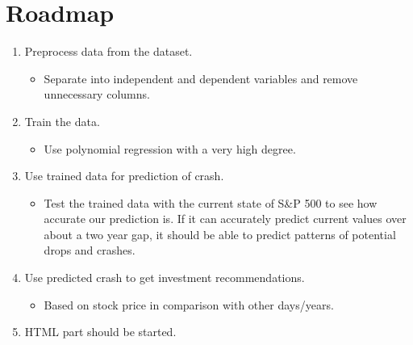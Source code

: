 \documentclass{article}
\begin{document}
\section{Roadmap}
	\begin{enumerate}
		\item Preprocess data from the dataset.
			\begin{itemize}
				\item Separate into independent and dependent variables and remove unnecessary columns.
			\end{itemize}			 
		\item Train the data.
			\begin{itemize}
				\item Use polynomial regression with a very high degree.
			\end{itemize}	
		\item Use trained data for prediction of crash.
			\begin{itemize}
				\item Test the trained data with the current state of S\&P 500 to see how accurate our prediction is. If it can accurately predict current values over about a two year gap, it should be able to predict patterns of potential drops and crashes.
			\end{itemize}	
		\item Use predicted crash to get investment recommendations.
			\begin{itemize}
				\item Based on stock price in comparison with other days/years.
			\end{itemize}	
		\item HTML part should be started.

	\end{enumerate}
\end{document}
